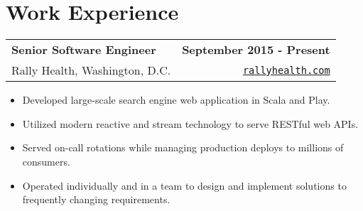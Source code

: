 \documentclass[letterpaper]{article}
\newenvironment{details}
{\begin{itemize}}
{\end{itemize}}
\begin{document}
%
%
%
%


  \section{Work Experience}

  \noindent
  \begin{tabularx}{\textwidth}{@{}X r@{}}
    \textbf{Senior Software Engineer} & \textbf{September 2015 - Present} \\
    Rally Health, Washington, D.C. & \texttt{\href{http://rallyhealth.com}{rallyhealth.com}}
  \end{tabularx}

  \begin{details}
  \item Developed large-scale search engine web application in Scala and Play.
  \item Utilized modern reactive and stream technology to serve RESTful web APIs.
  \item Served on-call rotations while managing production deploys to millions of consumers.
  \item Operated individually and in a team to design and implement solutions to frequently changing requirements.
  \end{details}
\end{document}
